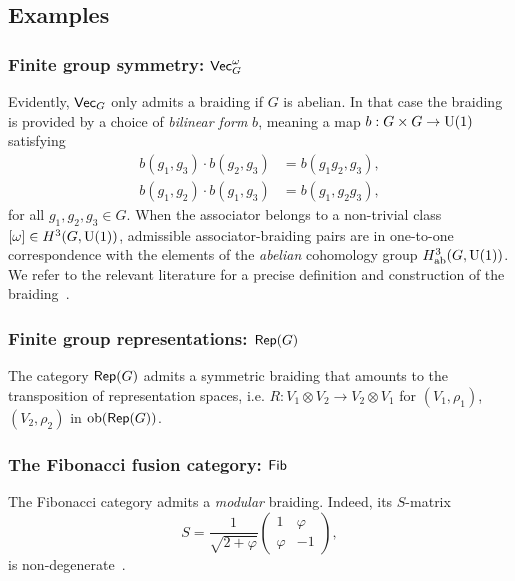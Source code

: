 \subsection{Examples}
\subsubsection{Finite group symmetry: $\mathsf{Vec}_G^\omega$} Evidently, $\mathsf{Vec}_G$ only admits a braiding if $G$ is abelian. In that case the braiding is provided by a choice of \emph{bilinear form} $b$, meaning a map $b:G\times G\to {\rm U}(1)$ satisfying
\begin{equation}
	\begin{split}
		b(g_1,g_3)\cdot b(g_2,g_3) &= b(g_1g_2,g_3), \\
		b(g_1,g_2)\cdot b(g_1,g_3) &= b(g_1,g_2g_3),
	\end{split}
\end{equation}
for all $g_1,g_2,g_3\in G$. When the associator belongs to a non-trivial class $[\omega]\in H^3(G,{\rm U}(1))$,  admissible associator-braiding pairs are in one-to-one correspondence with the elements of the \emph{abelian} cohomology group $H^3_{\rm ab}(G,{\rm U}(1))$. We refer to the relevant literature for a precise definition and construction of the braiding~\cite{Etingof2015}.
\subsubsection{Finite group representations: $\mathsf{Rep}(G)$} The category $\mathsf{Rep}(G)$ admits a symmetric braiding that amounts to the transposition of representation spaces, i.e. $R:V_1\otimes V_2 \to V_2\otimes V_1$ for $(V_1,\rho_1)$, $(V_2,\rho_2)$ in ${\rm ob}(\mathsf{Rep}(G))$.
\subsubsection{The Fibonacci fusion category: $\mathsf{Fib}$} The Fibonacci category admits a \emph{modular} braiding. Indeed, its $S$-matrix
\begin{equation}
	S =
	\frac{1}{\sqrt{2+\varphi}}
	\begin{pmatrix}
		1 & \varphi \\
		\varphi & -1
	\end{pmatrix},
\end{equation}
is non-degenerate~\cite{Rowell2007}.